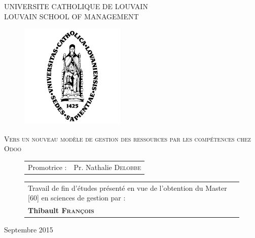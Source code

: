 \parindent=0cm



\begin{center}
{\large    UNIVERSITE CATHOLIQUE DE LOUVAIN \\
LOUVAIN SCHOOL OF MANAGEMENT \\
}
   \end{center}
\vfill

 \begin{figure}[H]
\begin{center}  \hspace*{-10mm} 
	\includegraphics[height = 5cm]{alma.png}
   \end{center}
\end{figure}


\vfill


\begin{center}
{\Large \textsc{Vers un nouveau modèle de gestion des ressources par les compétences chez Odoo}}
\end{center}



\vfill

 \begin{figure}[H]
 \begin{minipage}[c]{.45\linewidth}
		\begin{tabular}{ll}
		Promotrice : & Pr. Nathalie \textsc{Delobbe} \\

		\end{tabular}
\end{minipage} \hfill
 \begin{minipage}[c]{.45\linewidth}
 \begin{tabularx}{\linewidth}{p{\textwidth}}
Travail de fin d'études présenté en vue de \hbox{l'obtention} du Master [60] en sciences de gestion par :\\
\textbf{Thibault \textsc{François}}

\end{tabularx}
\end{minipage}
\end{figure}

\vspace{1,5cm}



\begin{center}
{\large Septembre 2015}
\end{center}
